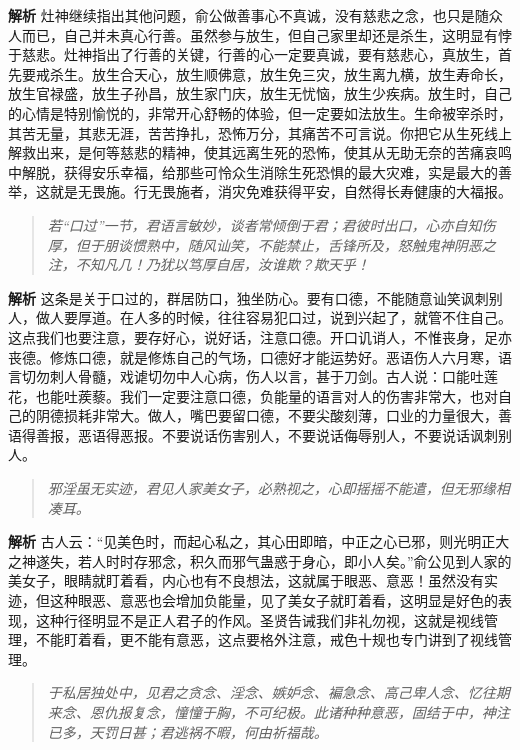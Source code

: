 \textbf{解析} 灶神继续指出其他问题，俞公做善事心不真诚，没有慈悲之念，也只是随众人而已，自己并未真心行善。虽然参与放生，但自己家里却还是杀生，这明显有悖于慈悲。灶神指出了行善的关键，行善的心一定要真诚，要有慈悲心，真放生，首先要戒杀生。放生合天心，放生顺佛意，放生免三灾，放生离九横，放生寿命长，放生官禄盛，放生子孙昌，放生家门庆，放生无忧恼，放生少疾病。放生时，自己的心情是特别愉悦的，非常开心舒畅的体验，但一定要如法放生。生命被宰杀时，其苦无量，其悲无涯，苦苦挣扎，恐怖万分，其痛苦不可言说。你把它从生死线上解救出来，是何等慈悲的精神，使其远离生死的恐怖，使其从无助无奈的苦痛哀鸣中解脱，获得安乐幸福，给那些可怜众生消除生死恐惧的最大灾难，实是最大的善举，这就是无畏施。行无畏施者，消灾免难获得平安，自然得长寿健康的大福报。

\begin{quote}\it
    若“口过”一节，君语言敏妙，谈者常倾倒于君；君彼时出口，心亦自知伤厚，但于朋谈惯熟中，随风讪笑，不能禁止，舌锋所及，怒触鬼神阴恶之注，不知凡几！乃犹以笃厚自居，汝谁欺？欺天乎！
\end{quote}

\textbf{解析} 这条是关于口过的，群居防口，独坐防心。要有口德，不能随意讪笑讽刺别人，做人要厚道。在人多的时候，往往容易犯口过，说到兴起了，就管不住自己。这点我们也要注意，要存好心，说好话，注意口德。开口讥诮人，不惟丧身，足亦丧德。修炼口德，就是修炼自己的气场，口德好才能运势好。恶语伤人六月寒，语言切勿刺人骨髓，戏谑切勿中人心病，伤人以言，甚于刀剑。古人说：口能吐莲花，也能吐蒺藜。我们一定要注意口德，负能量的语言对人的伤害非常大，也对自己的阴德损耗非常大。做人，嘴巴要留口德，不要尖酸刻薄，口业的力量很大，善语得善报，恶语得恶报。不要说话伤害别人，不要说话侮辱别人，不要说话讽刺别人。

\begin{quote}\it
    邪淫虽无实迹，君见人家美女子，必熟视之，心即摇摇不能遣，但无邪缘相凑耳。
\end{quote}

\textbf{解析} 古人云：“见美色时，而起心私之，其心田即暗，中正之心已邪，则光明正大之神遂失，若人时时存邪念，积久而邪气蛊惑于身心，即小人矣。”俞公见到人家的美女子，眼睛就盯着看，内心也有不良想法，这就属于眼恶、意恶！虽然没有实迹，但这种眼恶、意恶也会增加负能量，见了美女子就盯着看，这明显是好色的表现，这种行径明显不是正人君子的作风。圣贤告诫我们非礼勿视，这就是视线管理，不能盯着看，更不能有意恶，这点要格外注意，戒色十规也专门讲到了视线管理。

\begin{quote}\it
    于私居独处中，见君之贪念、淫念、嫉妒念、褊急念、高己卑人念、忆往期来念、恩仇报复念，憧憧于胸，不可纪极。此诸种种意恶，固结于中，神注已多，天罚日甚；君逃祸不暇，何由祈福哉。
\end{quote}

